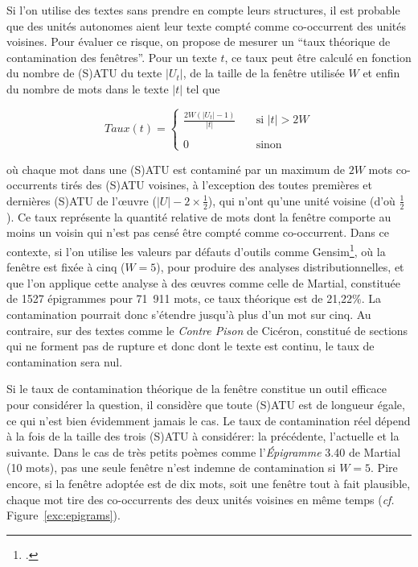 Si l'on utilise des textes sans prendre en compte leurs structures, il est probable que des unités autonomes aient leur texte compté comme co-occurrent des unités voisines. Pour évaluer ce risque, on propose de mesurer un \enquote{taux théorique de contamination des fenêtres}. Pour un texte $t$, ce taux peut être calculé en fonction du nombre de (S)ATU du texte $\left | U_{t} \right |$, de la taille de la fenêtre utilisée $W$ et enfin du nombre de mots dans le texte $\left | t \right |$ tel que

\begin{equation*}
    Taux(t) = \left \{ %
    \begin{array}{ll}
         \frac{2W(\left|U_{t}\right| - 1)}{\left|t\right|} & \quad \text{si $\left|t\right| > 2W$} \\\\
         0 & \quad \text{sinon}
    \end{array} %
    \right .
\label{equation:twcr}
\end{equation*}

\noindent où chaque mot dans une (S)ATU est contaminé par un maximum de $2W$ mots co-occurrents tirés des (S)ATU voisines, à l'exception des toutes premières et dernières (S)ATU de l'œuvre ($\left|U\right| - 2 \times \frac{1}{2}$), qui n'ont qu'une unité voisine (d'où $\frac{1}{2}$). Ce taux représente la quantité relative de mots dont la fenêtre comporte au moins un voisin qui n'est pas censé être compté comme co-occurrent. Dans ce contexte, si l'on utilise les valeurs par défauts d'outils comme Gensim\footcite{vrehuuvrek2011gensim}, où la fenêtre est fixée à cinq ($W=5$), pour produire des analyses distributionnelles, et que l'on applique cette analyse à des œuvres comme celle de Martial, constituée de 1527 épigrammes pour 71~911 mots, ce taux théorique est de 21,22\%. La contamination pourrait donc s'étendre jusqu'à plus d'un mot sur cinq. Au contraire, sur des textes comme le \textit{Contre Pison} de Cicéron, constitué de sections qui ne forment pas de rupture et donc dont le texte est continu, le taux de contamination sera nul.

Si le taux de contamination théorique de la fenêtre constitue un outil efficace pour considérer la question, il considère que toute (S)ATU est de longueur égale, ce qui n'est bien évidemment jamais le cas. Le taux de contamination réel dépend à la fois de la taille des trois (S)ATU à considérer: la précédente, l'actuelle et la suivante. Dans le cas de très petits poèmes comme l'\textit{Épigramme} 3.40 de Martial (10 mots), pas une seule fenêtre n’est indemne de contamination si $W=5$. Pire encore, si la fenêtre adoptée est de dix mots, soit une fenêtre tout à fait plausible, chaque mot tire des co-occurrents des deux unités voisines en même temps (\textit{cf.} Figure~\ref{exc:epigrams}).


